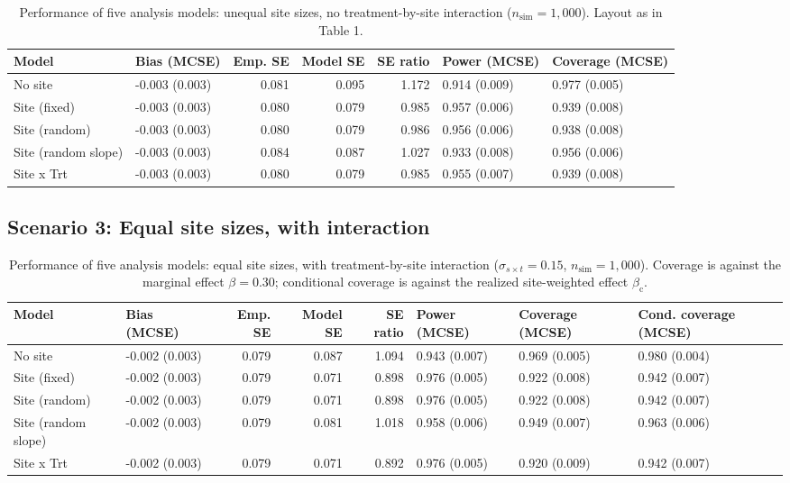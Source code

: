 \documentclass[
  11pt,
]{article}
\begin{document}
\begin{table}[!h]
\centering
\caption{\label{tab:tab-unequal-no}Performance of five analysis models: unequal site sizes, no treatment-by-site interaction ($n_{\mathrm{sim}} = 1{,}000$). Layout as in Table 1.}
\centering
\fontsize{8}{10}\selectfont
\begin{tabular}[t]{llrrrll}
\toprule
Model & Bias (MCSE) & Emp. SE & Model SE & SE ratio & Power (MCSE) & Coverage (MCSE)\\
\midrule
No site & -0.003 (0.003) & 0.081 & 0.095 & 1.172 & 0.914 (0.009) & 0.977 (0.005)\\
Site (fixed) & -0.003 (0.003) & 0.080 & 0.079 & 0.985 & 0.957 (0.006) & 0.939 (0.008)\\
Site (random) & -0.003 (0.003) & 0.080 & 0.079 & 0.986 & 0.956 (0.006) & 0.938 (0.008)\\
Site (random slope) & -0.003 (0.003) & 0.084 & 0.087 & 1.027 & 0.933 (0.008) & 0.956 (0.006)\\
Site x Trt & -0.003 (0.003) & 0.080 & 0.079 & 0.985 & 0.955 (0.007) & 0.939 (0.008)\\
\bottomrule
\end{tabular}
\end{table}

\subsection{Scenario 3: Equal site sizes, with interaction}\label{scenario-3-equal-site-sizes-with-interaction}

\begin{table}[!h]
\centering
\caption{\label{tab:tab-equal-int}Performance of five analysis models: equal site sizes, with treatment-by-site interaction ($\sigma_{s \times t} = 0.15$, $n_{\mathrm{sim}} = 1{,}000$). Coverage is against the marginal effect $\beta = 0.30$; conditional coverage is against the realized site-weighted effect $\beta_{\mathrm{c}}$.}
\centering
\fontsize{8}{10}\selectfont
\begin{tabular}[t]{llrrrlll}
\toprule
Model & Bias (MCSE) & Emp. SE & Model SE & SE ratio & Power (MCSE) & Coverage (MCSE) & Cond. coverage (MCSE)\\
\midrule
No site & -0.002 (0.003) & 0.079 & 0.087 & 1.094 & 0.943 (0.007) & 0.969 (0.005) & 0.980 (0.004)\\
Site (fixed) & -0.002 (0.003) & 0.079 & 0.071 & 0.898 & 0.976 (0.005) & 0.922 (0.008) & 0.942 (0.007)\\
Site (random) & -0.002 (0.003) & 0.079 & 0.071 & 0.898 & 0.976 (0.005) & 0.922 (0.008) & 0.942 (0.007)\\
Site (random slope) & -0.002 (0.003) & 0.079 & 0.081 & 1.018 & 0.958 (0.006) & 0.949 (0.007) & 0.963 (0.006)\\
Site x Trt & -0.002 (0.003) & 0.079 & 0.071 & 0.892 & 0.976 (0.005) & 0.920 (0.009) & 0.942 (0.007)\\
\bottomrule
\end{tabular}
\end{table}
\end{document}
